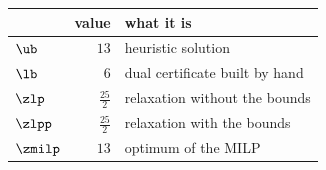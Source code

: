 \begin{center}\small
\begin{tabular}{lrl}
\toprule
 & value & what it is \\
\midrule
$\ub$ & $13$ & heuristic solution \\
$\lb$ & $6$ & dual certificate built by hand \\
$\zlp$ & $\frac{25}{2}$ & relaxation without the bounds \\
$\zlpp$ & $\frac{25}{2}$ & relaxation with the bounds \\
$\zmilp$ & $13$ & optimum of the MILP \\
\bottomrule
\end{tabular}
\end{center}
